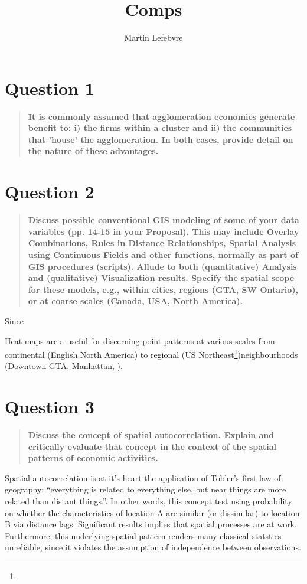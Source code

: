\documentclass[12pt,letterpaper,notitlepage,onecolumn,final,openbib]{article}
\author{Martin Lefebvre}
\title{Comps}
\begin{document}
	
\section{Question 1}
\begin{quotation}
\textbf{It is commonly assumed that agglomeration economies generate benefit to: i) the firms within a cluster and ii) the communities that 'house' the agglomeration. In both cases, provide detail on the nature of these advantages.}
\end{quotation}
\section{Question 2}
\begin{quotation}
\textbf{Discuss possible conventional GIS modeling of some of your data variables (pp. 14-15 in your Proposal). This may include Overlay Combinations, Rules in Distance Relationships, Spatial Analysis using Continuous Fields and other functions, normally as part of GIS procedures (scripts). Allude to both (quantitative) Analysis and (qualitative) Visualization results. Specify the spatial scope for these models, e.g., within cities, regions (GTA, SW Ontario), or at coarse scales (Canada, USA, North America).}
\end{quotation}

Since 

Heat maps are a useful for discerning point patterns at various scales from continental (English North America) to regional (US Northeast\footnote{})neighbourhoods (Downtown GTA, Manhattan, ).   





\section{Question 3}
\begin{quotation}
\textbf{Discuss the concept of spatial autocorrelation. Explain and critically evaluate that concept in the context of the spatial patterns of economic activities.}
\end{quotation}

Spatial autocorrelation is at it's heart the application of Tobler's first law of geography: ``everything is related to everything else, but near things are more related than distant things.''\cite[page  236]{toblera1970}.  In other words, this concept test using probability on whether the characteristics of location A are similar (or dissimilar) to location B via distance lags.   Significant results implies that spatial processes are at work.  Furthermore, this underlying spatial pattern renders many classical statstics unreliable, since it violates the assumption of independence between observations. 
\end{document}
